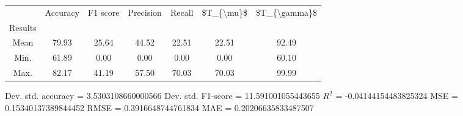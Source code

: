 \begin{tabular}{|c|c|c|c|c|c|c|}
\toprule
{} &  Accuracy &  F1 score &  Precision &  Recall &  \$T\_\{\textbackslash mu\}\$ &  \$T\_\{\textbackslash gamma\}\$ \\
Results &           &           &            &         &            &               \\
\hline
Mean    &     79.93 &     25.64 &      44.52 &   22.51 &      22.51 &         92.49 \\
Min.    &     61.89 &      0.00 &       0.00 &    0.00 &       0.00 &         60.10 \\
Max.    &     82.17 &     41.19 &      57.50 &   70.03 &      70.03 &         99.99 \\
\bottomrule
\end{tabular}

 Dev. std. accuracy = 3.5303108660000566
 Dev. std. F1-score = 11.591001055443655
 $R^2$ = -0.04144154483825324
 MSE = 0.15340137389844452
 RMSE = 0.3916648744761834
 MAE = 0.20206635833487507